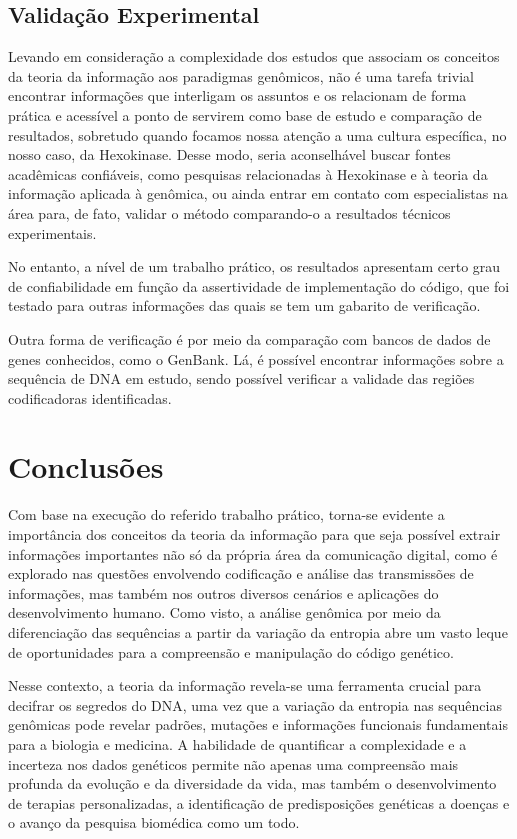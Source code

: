 \documentclass{article}
\begin{document}
\subsection{Validação Experimental}
Levando em consideração a complexidade dos estudos que associam os conceitos da teoria da informação aos paradigmas genômicos, não é uma tarefa trivial encontrar informações que interligam os assuntos e os relacionam de forma prática e acessível a ponto de servirem como base de estudo e comparação de resultados, sobretudo quando focamos nossa atenção a uma cultura específica, no nosso caso, da Hexokinase. Desse modo, seria aconselhável buscar fontes acadêmicas confiáveis, como pesquisas relacionadas à Hexokinase e à teoria da informação aplicada à genômica, ou ainda  entrar em contato com especialistas na área para, de fato, validar o método comparando-o a resultados técnicos experimentais.

No entanto, a nível de um trabalho prático, os resultados apresentam certo grau de confiabilidade em função da assertividade de implementação do código, que foi testado para outras informações das quais se tem um gabarito de verificação. 

Outra forma de verificação é por meio da comparação com bancos de dados de genes conhecidos, como o GenBank. Lá, é possível encontrar informações sobre a sequência de DNA em estudo, sendo possível verificar a validade das regiões codificadoras identificadas.

\section{Conclusões}
Com base na execução do referido trabalho prático, torna-se evidente a importância dos conceitos da teoria da informação para que seja possível extrair informações importantes não só da própria área da comunicação digital, como é explorado nas questões envolvendo codificação e análise das transmissões de informações, mas também nos outros diversos cenários e aplicações do desenvolvimento humano. Como visto, a análise genômica por meio da diferenciação das sequências a partir da variação da entropia abre um vasto leque de oportunidades para a compreensão e manipulação do código genético.

Nesse contexto, a teoria da informação revela-se uma ferramenta crucial para decifrar os segredos do DNA, uma vez que a variação da entropia nas sequências genômicas pode revelar padrões, mutações e informações funcionais fundamentais para a biologia e medicina. A habilidade de quantificar a complexidade e a incerteza nos dados genéticos permite não apenas uma compreensão mais profunda da evolução e da diversidade da vida, mas também o desenvolvimento de terapias personalizadas, a identificação de predisposições genéticas a doenças e o avanço da pesquisa biomédica como um todo.
\end{document}
